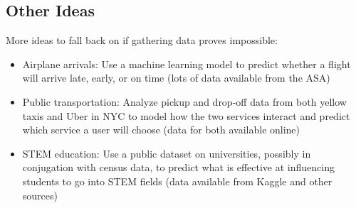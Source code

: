 \documentclass[10pt]{article}
\begin{document}
\subsection*{Other Ideas}
More ideas to fall back on if gathering data proves impossible:
\begin{itemize}
  \item Airplane arrivals: Use a machine learning model to predict whether a flight will arrive late, early, or on time (lots of data available from the ASA)
  \item Public transportation: Analyze pickup and drop-off data from both yellow taxis and Uber in NYC to model how the two services interact and predict which service a user will choose (data for both available online)
  \item STEM education: Use a public dataset on universities, possibly in conjugation with census data, to predict what is effective at influencing students to go into STEM fields (data available from Kaggle and other sources)
\end{itemize}
\end{document}
